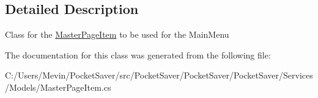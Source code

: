 \subsection{Detailed Description}
Class for the \hyperlink{class_pocket_saver_1_1_models_1_1_master_page_item}{Master\+Page\+Item} to be used for the Main\+Menu 



The documentation for this class was generated from the following file\+:\begin{DoxyCompactItemize}
\item 
C\+:/\+Users/\+Mevin/\+Pocket\+Saver/src/\+Pocket\+Saver/\+Pocket\+Saver/\+Pocket\+Saver/\+Services/\+Models/Master\+Page\+Item.\+cs\end{DoxyCompactItemize}

